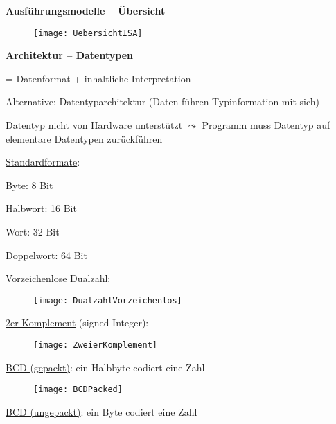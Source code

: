 \textbf{Ausführungsmodelle -- Übersicht} \\
\begin{items}
	\item 
	\begin{center}
	\end{center}
	\begin{figure}[ht]
	  \centering
	  \texttt{[image: UebersichtISA]}
	  \label{UebersichtISA}
	\end{figure}
\end{items}

\textbf{Architektur -- Datentypen}
\begin{items}
	\item = Datenformat + inhaltliche Interpretation
	\item Alternative: Datentyparchitektur (Daten führen Typinformation mit sich)
	\item Datentyp nicht von Hardware unterstützt $\leadsto$ Programm muss Datentyp auf elementare Datentypen zurückführen
	\item \underline{Standardformate}:
	\begin{enumeration}
		\item Byte: 8 Bit
		\item Halbwort: 16 Bit
		\item Wort: 32 Bit
		\item Doppelwort: 64 Bit
	\end{enumeration}
	\item \underline{Vorzeichenlose Dualzahl}:
	\begin{figure}[ht]
	  \centering
	  \texttt{[image: DualzahlVorzeichenlos]}
	  \label{DualzahlVorzeichenlos}
	\end{figure}
	\item \underline{2er-Komplement} (signed Integer):
	\begin{figure}[ht]
	  \centering
	  \texttt{[image: ZweierKomplement]}
	  \label{ZweierKomplement}
	\end{figure}
	\newpage
	\item \underline{BCD (gepackt)}: ein Halbbyte codiert eine Zahl
	\begin{figure}[ht]
	  \centering
	  \texttt{[image: BCDPacked]}
	  \label{BCDPacked}
	\end{figure}
	\item \underline{BCD (ungepackt)}: ein Byte codiert eine Zahl
	\begin{figure}[ht]

\end{figure}
\end{items}
